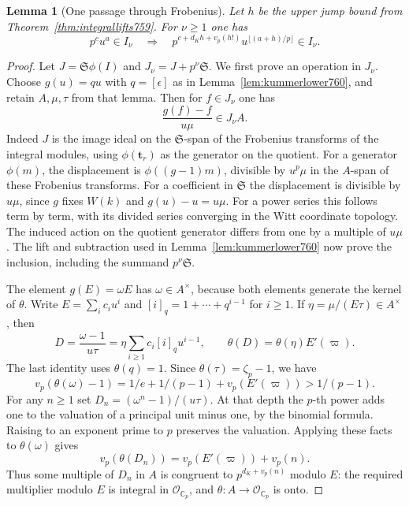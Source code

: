 \documentclass[a4paper,11pt]{article}
\newtheorem{lemma}[proposition]{Lemma}
\theoremstyle{definition}
\theoremstyle{remark}
\numberwithin{equation}{section}
\begin{document}
\begin{lemma}[One passage through Frobenius]
\leavevmode\label{lem:transportpower761}
Let \(h\) be the upper jump bound from
Theorem~\ref{thm:integrallifts759}. For \(\nu\ge1\) one has
\[
 p^cu^a\in I_\nu
 \quad\Longrightarrow\quad
 p^{c+d_K h+v_p(h!)}u^{\lfloor(a+h)/p\rfloor}\in I_\nu .
\]
\end{lemma}
\begin{proof}
Let \(J=\mathfrak S\phi(I)\) and \(J_\nu=J+p^\nu\mathfrak S\).
We first prove an operation in \(J_\nu\). Choose
\(g(u)=q u\) with \(q=[\epsilon]\) as in
Lemma~\ref{lem:kummerlower760}, and retain \(A,\mu,\tau\)
from that lemma. Then for \(f\in J_\nu\) one has
\[
                     \frac{g(f)-f}{u\mu}\in J_\nu A.
\]
Indeed \(J\) is the image ideal on the \(\mathfrak S\)-span
of the Frobenius transforms of the integral modules, using
\(\phi(\mathbf t_r)\) as the generator on the quotient.
For a generator \(\phi(m)\), the displacement is
\(\phi((g-1)m)\), divisible by \(u^p\mu\) in the \(A\)-span
of these Frobenius transforms. For a coefficient in
\(\mathfrak S\) the displacement is divisible by \(u\mu\),
since \(g\) fixes \(W(k)\) and \(g(u)-u=u\mu\).
For a power series this follows term by term, with its divided
series converging in the Witt coordinate topology. The induced
action on the quotient generator differs from one by a multiple
of \(u\mu\). The lift and subtraction used in
Lemma~\ref{lem:kummerlower760} now prove the inclusion, including
the summand \(p^\nu\mathfrak S\).

The element \(g(E)=\omega E\) has \(\omega\in A^\times\),
because both elements generate the kernel of \(\theta\). Write
\(E=\sum_i c_i u^i\) and \([i]_q=1+\cdots+q^{i-1}\) for
\(i\ge1\). If \(\eta=\mu/(E\tau)\in A^\times\), then
\[
     D=\frac{\omega-1}{u\tau}
         =\eta\sum_{i\ge1} c_i[i]_q u^{i-1},\qquad
     \theta(D)=\theta(\eta)E'(\varpi).
\]
The last identity uses \(\theta(q)=1\). Since
\(\theta(\tau)=\zeta_p-1\), we have
\[
   v_p(\theta(\omega)-1)
      =1/e+1/(p-1)+v_p(E'(\varpi))>1/(p-1).
\]
For any \(n\ge1\) set \(D_n=(\omega^n-1)/(u\tau)\).
At that depth the \(p\)-th power adds one to the valuation
of a principal unit minus one, by the binomial formula.
Raising to an exponent prime to \(p\) preserves the valuation.
Applying these facts to \(\theta(\omega)\) gives
\[
           v_p(\theta(D_n))=v_p(E'(\varpi))+v_p(n).
\]
Thus some multiple of \(D_n\) in \(A\) is congruent to
\(p^{d_K+v_p(n)}\) modulo \(E\): the required multiplier
modulo \(E\) is integral in \(\mathcal O_{\mathbb C_p}\),
and \(\theta:A\to\mathcal O_{\mathbb C_p}\) is onto.


\end{proof}
\end{document}
